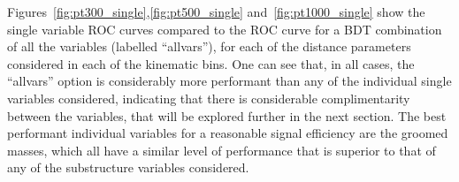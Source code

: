 Figures~\ref{fig:pt300_single},\ref{fig:pt500_single}
and~\ref{fig:pt1000_single} show the single variable ROC curves
compared to the ROC curve for a BDT combination of all the variables
(labelled ``allvars''),
for each of the \antikt distance parameters considered in each of the
kinematic bins. One can see that, in all cases, the ``allvars'' option
is considerably more performant than any of the individual single variables
considered, indicating that there is considerable complimentarity
between the variables, that will be explored further in the next
section. The best performant individual variables for a reasonable signal
efficiency are the groomed masses, which all have a similar
level of performance that is superior to that of any of the
substructure variables considered. 





%

